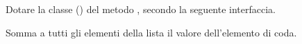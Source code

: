Dotare la classe  () del metodo , secondo la seguente interfaccia.

\begin{methodslist}

 {
Somma a tutti gli elementi della lista il valore dell'elemento di coda.
}

\end{methodslist}